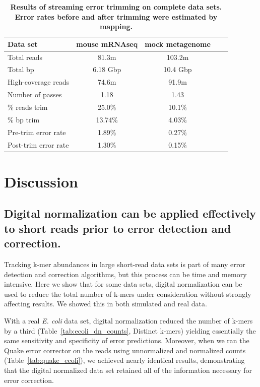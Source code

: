 \documentclass{article}
\begin{document}

\begin{table}
\begin{tabular}{|l|c|c|c|c|}
\hline

Data set             & mouse mRNAseq      & mock metagenome \\
\hline
Total reads          & 81.3m         & 103.2m \\
Total bp             & 6.18 Gbp      & 10.4 Gbp \\
High-coverage reads  & 74.6m         & 91.9m \\
Number of passes     & 1.18          & 1.43 \\
\% reads trim        & 25.0\%        & 10.1\% \\
\% bp trim           & 13.74\%       & 4.03\% \\
Pre-trim error rate  & 1.89\%        & 0.27\% \\
Post-trim error rate & 1.30\%        & 0.15\% \\
\hline
\end{tabular}

\caption{{\bf Results of streaming error trimming on complete data sets.
Error rates before and after trimming were estimated by mapping.}}
\label{tab:full_trimming}
\end{table}

\section{Discussion}

\subsection{Digital normalization can be applied effectively to short reads prior to error detection and correction.}

Tracking k-mer abundances in large short-read data sets is part of
many error detection and correction algorithms, but this process can
be time and memory intensive.  Here we show that for some data sets,
digital normalization can be used to reduce the total number of k-mers
under consideration without strongly affecting results.
We showed this in both simulated and real data.

With a real {\em E. coli} data set, digital normalization reduced the
number of k-mers by a third (Table~\ref{tab:ecoli_dn_counts}, Distinct
k-mers) yielding essentially the same sensitivity and specificity of
error predictions.  Moreover, when we ran the Quake error corrector on
the reads using unnormalized and normalized counts
(Table~\ref{tab:quake_ecoli}), we achieved nearly identical results,
demonstrating that the digital normalized data set retained all of the
information necessary for error correction.
\end{document}
